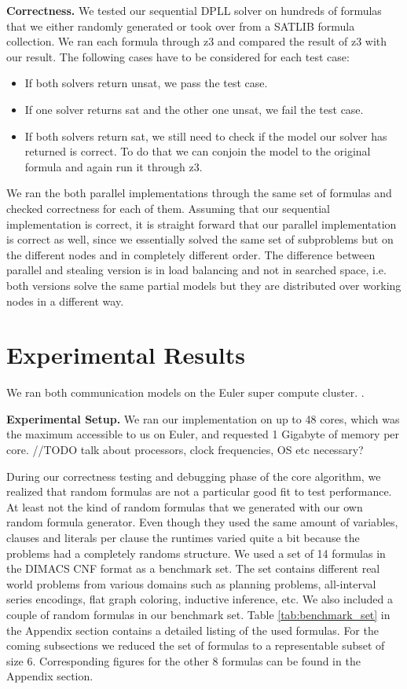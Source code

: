 \documentclass[letterpaper]{article}
\newcommand{\mypar}[1]{{\bf #1.}}
\begin{document}
\mypar{Correctness}
We tested our sequential DPLL solver on hundreds of formulas that we either randomly generated or took over from a SATLIB formula collection. \cite{cnf_website}
We ran each formula through z3 \cite{z3} and compared the result of z3 with our result.
The following cases have to be considered for each test case:
\begin{itemize}
    \item If both solvers return unsat, we pass the test case.
    \item If one solver returns sat and the other one unsat, we fail the test case.
    \item If both solvers return sat, we still need to check if the model our solver has returned is correct.
        To do that we can conjoin the model to the original formula and again run it through z3.
\end{itemize}

We ran the both parallel implementations through the same set of formulas and checked correctness for each of them.
Assuming that our sequential implementation is correct, it is straight forward that our parallel implementation is correct as well, since we essentially solved the same set of subproblems but on the different nodes and in completely different order. The difference between parallel and stealing version is in load balancing and not in searched space, i.e. both versions solve the same partial models but they are distributed over working nodes in a different way.


\section{Experimental Results}\label{sec:exp}

We ran both communication models on the Euler super compute cluster. \cite{euler}.

\mypar{Experimental Setup}
We ran our implementation on up to 48 cores, which was the maximum accessible to us on Euler, and requested 1 Gigabyte of memory per core.
//TODO talk about processors, clock frequencies, OS etc necessary?

During our correctness testing and debugging phase of the core algorithm, we realized that random formulas are not a particular good fit to test performance.
At least not the kind of random formulas that we generated with our own random formula generator.
Even though they used the same amount of variables, clauses and literals per clause the runtimes varied quite a bit because the problems had a completely randoms structure.
We used a set of 14 formulas in the DIMACS CNF format as a benchmark set.
The set contains different real world problems from various domains such as planning problems, all-interval series encodings, flat graph coloring, inductive inference, etc.
We also included a couple of random formulas in our benchmark set.
Table \ref{tab:benchmark_set} in the Appendix section contains a detailed listing of the used formulas.
For the coming subsections we reduced the set of formulas to a representable subset of size 6.
Corresponding figures for the other 8 formulas can be found in the Appendix section.
\end{document}
